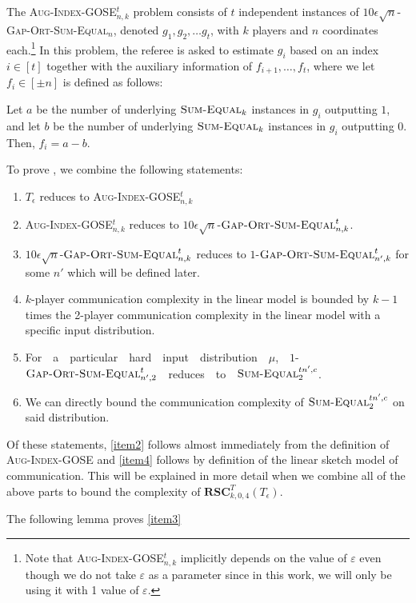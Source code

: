 \documentclass{toc}
\newcommand{\rsc}{\ensuremath{\mathbf{RSC}}}
\newcommand{\sumequal}{\textsc{Sum-Equal} }
\newcommand{\gose}{\textsc{Gap-Ort-Sum-Equal}}
\newcommand{\auggo}{\textsc{Aug-Index-GOSE}}
\begin{document}
\begin{definition}
The \auggo$_{n,k}^t$ problem consists of $t$ independent instances of $10\epsilon\sqrt{n}$-\gose$_n$, denoted $g_1, g_2, \dots g_t$, with $k$ players and $n$ coordinates each.\footnote{Note that \auggo$_{n,k}^t$ implicitly depends on the value of $\varepsilon$ even though we do not take $\varepsilon$ as a parameter since in this work, we will only be using it with 1 value of $\varepsilon$.} In this problem, the referee is asked to estimate $g_i$ based on an index $i\in[t]$ together with the auxiliary information of $f_{i+1},\dots, f_t$, where we let $f_i \in [\pm n]$ is defined as follows:

{\color{black}Let $a$ be the number of underlying $\sumequal_k$ instances in $g_i$ outputting $1$, and let $b$ be the number of underlying $\sumequal_k$ instances in $g_i$ outputting $0$. Then, $f_i = a-b$.}
\end{definition}
{\color{black}
To prove , we combine the following statements:
%

%
%
\begin{enumerate}[(1)]
    \item \label{item1} $T_\epsilon$ reduces to \auggo$_{n,k}^t$
    \item \label{item2}
      \auggo$_{n,k}^t$ reduces to $10\epsilon \sqrt{n}$-$\gose_{n,k}^t$.
    \item \label{item3}
$10\epsilon \sqrt{n}$-$\gose_{n,k}^t$ reduces to $1$-$\gose_{n',k}^t$ for some $n'$ which will be defined later.
    \item \label{item4}
$k$-player communication complexity in the linear model is bounded by $k-1$ times the 2-player communication complexity in the linear model with a specific input distribution.
%
%
    \item \label{item5}
For\ \  a\ \ particular\ \ hard\ \ input\ \ distribution\ \ $\mu$,\ \
 $1$-$\gose_{n',2}^t$\ \ reduces\ \ to\ \ $\sumequal_2^{tn',c}$.
    \item \label{item6}
We can directly bound the communication complexity of $\sumequal_2^{tn',c}$ on said distribution.
\end{enumerate}
Of these statements, %
\ref{item2}   %
follows almost immediately from the definition of \auggo \hspace{0em} and 
%
\ref{item4}   %
follows by definition of the linear sketch model of communication. This will be explained in more detail when we combine all of the above parts to bound the complexity of $\rsc_{k,0,4}^T(T_\epsilon)$.

The following lemma proves %
\ref{item3}   %
}
\end{document}
